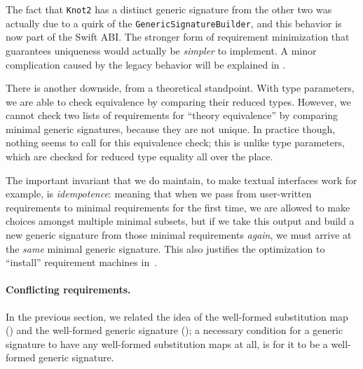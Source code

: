 \documentclass[../generics]{subfiles}
\begin{document}
The fact that \texttt{Knot2} has a distinct generic signature from the other two was actually due to a quirk of the \texttt{GenericSignatureBuilder}, and this behavior is now part of the Swift ABI. The stronger form of requirement minimization that guarantees uniqueness would actually be \emph{simpler} to implement. A minor complication caused by the legacy behavior will be explained in .

There is another downside, from a theoretical standpoint. With type parameters, we are able to check equivalence by comparing their reduced types. However, we cannot check two lists of requirements for ``theory equivalence'' by comparing minimal generic signatures, because they are not unique. In practice though, nothing seems to call for this equivalence check; this is unlike type parameters, which are checked for reduced type equality all over the place.

The important invariant that we do maintain, to make textual interfaces work for example, is \emph{idempotence}: meaning that when we pass from user-written requirements to minimal requirements for the first time, we are allowed to make choices amongst multiple minimal subsets, but if we take this output and build a new generic signature from those minimal requirements \emph{again}, we must arrive at the \emph{same} minimal generic signature. This also justifies the optimization to ``install'' requirement machines in~.

\paragraph{Conflicting requirements.} In the previous section, we related the idea of the well-formed substitution map () and the well-formed generic signature (); a necessary condition for a generic signature to have any well-formed substitution maps at all, is for it to be a well-formed generic signature.
\end{document}
